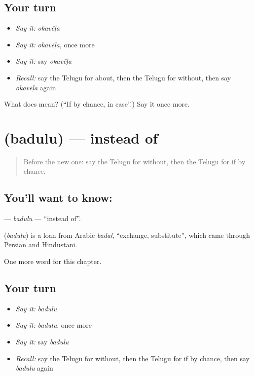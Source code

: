 \subsection*{Your turn}
\begin{itemize}
\raggedright
  \item \emph{Say it:} \emph{okavēḷa}
  \item \emph{Say it:} \emph{okavēḷa}, once more
  \item \emph{Say it:} say \emph{okavēḷa}
  \item \emph{Recall:} say the Telugu for about, then the Telugu for without, then say \emph{okavēḷa} again
\end{itemize}

\begin{tcolorbox}[breakable,colback=teal!4,colframe=teal!35!black,title={Before you move on}]
What does  mean? (\textquotedblleft{}If by chance, in case\textquotedblright{}.) Say it once more.
\end{tcolorbox}
\section[\texorpdfstring{\te{బదులు} (badulu)}{బదులు (badulu)}]{ (badulu) — instead of}

\label{lesson:TE-C177-badulu}



\begin{quote}
Before the new one: say the Telugu for without, then the Telugu for if by chance.
\end{quote}

\subsection*{You'll want to know: }
\textbf{} — \emph{badulu} — \textquotedblleft{}instead of\textquotedblright{}.

\begin{cousinweb}
\textbf{} (\emph{badulu}) is a loan from Arabic \emph{badal}, \textquotedblleft{}exchange, substitute\textquotedblright{}, which came through Persian and Hindustani.
\end{cousinweb}

\begin{grammarlens}[title={What you've built}]
One more word for this chapter.
\end{grammarlens}

\subsection*{Your turn}
\begin{itemize}
\raggedright
  \item \emph{Say it:} \emph{badulu}
  \item \emph{Say it:} \emph{badulu}, once more
  \item \emph{Say it:} say \emph{badulu}
  \item \emph{Recall:} say the Telugu for without, then the Telugu for if by chance, then say \emph{badulu} again
\end{itemize}

